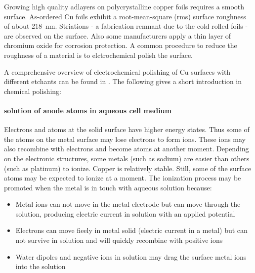 Growing high quality adlayers on polycrystalline copper foils requires a smooth surface. As-ordered Cu foils exhibit a root-mean-square (rms) surface roughness of about \SI{218}{\nm}\cite{bin_zhang_low-temperature_2012}. Striations - a fabrication remnant due to the cold rolled foils - are observed on the surface\cite{kim_synthesis_2012-1}. Also some manufacturers apply a thin layer of chromium oxide for corrosion protection\cite{bin_zhang_low-temperature_2012}. A common procedure to reduce the roughness of a material is to elctrochemical polish the surface.

A comprehensive overview of  electrochemical polishing of Cu surfaces with different etchants can be found in \cite{jinshan_electrochemical_2004}. The following gives a short introduction in chemical polishing:

\paragraph{solution of anode atoms in aqueous cell medium}
Electrons and atoms at the solid surface have higher energy states. Thus some of the atoms on the metal surface may lose electrons to form ions. These ions may also recombine with electrons and become atoms at another moment. Depending on the electronic structures, some metals (such as sodium) are easier than others (such as platinum) to ionize. Copper is relatively stable. Still, some of the surface atoms may be expected to ionize at a moment. The ionization process may be promoted when the metal is in touch with aqueous solution because: 
\begin{itemize}
 \item Metal ions can not move in the metal electrode but can move through the solution, producing electric current in solution with an applied potential
 \item Electrons can move fieely in metal solid (electric current in a metal) but can not survive in solution and will quickly recombine with positive ions
 \item Water dipoles and negative ions in solution may drag the surface metal ions into the solution
\end{itemize}

